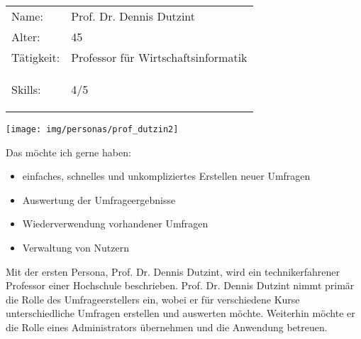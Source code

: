 
%
\newpage
{}
\begin{minipage}[t]{0.5\textwidth}
	\vspace{-3.6cm}
	\renewcommand{\arraystretch}{1.5}
	\begin{tabular}{l l}
		Name: & Prof. Dr. Dennis Dutzint \\
		Alter: & 45 \\
		Tätigkeit: & Professor für Wirtschaftsinformatik \\
		Skills: & 4/5 \hspace{-1cm} \begin{barchart}{5.0}
			\baritemNL{}{4}
		\end{barchart} \\
	\end{tabular}
\end{minipage}
\hfill
\begin{minipage}[t]{0.4\textwidth}
	\flushright
	\texttt{[image: img/personas/prof\_dutzin2]}
\end{minipage}
\autocite{rf-unsplash-dozent}

Das möchte ich gerne haben:
\begin{itemize}
	\item einfaches, schnelles und unkompliziertes Erstellen neuer Umfragen
	\item Auswertung der Umfrageergebnisse
    \item Wiederverwendung vorhandener Umfragen
    \item Verwaltung von Nutzern
\end{itemize}

Mit der ersten Persona, Prof. Dr. Dennis Dutzint, wird ein technikerfahrener Professor einer Hochschule beschrieben.
Prof. Dr. Dennis Dutzint nimmt primär die Rolle des Umfrageerstellers ein, wobei er für verschiedene Kurse unterschiedliche Umfragen erstellen und auswerten möchte.
Weiterhin möchte er die Rolle eines Administrators übernehmen und die Anwendung betreuen.
